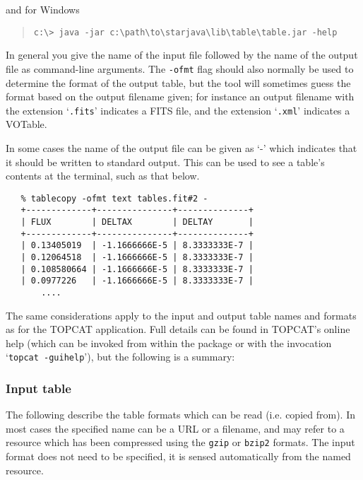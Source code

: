 \documentclass[twoside,11pt]{article}
\newcommand{\xlabel}[1]{}
\renewcommand{\_}{\texttt{\symbol{95}}}
\begin{document}
and for Windows

\begin{quote}
\begin{verbatim}
c:\> java -jar c:\path\to\starjava\lib\table\table.jar -help
\end{verbatim}
\end{quote}

In general you give the name of the input file followed by the
name of the output file as command-line arguments.  The \texttt{-ofmt}
flag should also normally be used to determine the format of the
output table, but the tool will sometimes guess the format based
on the output filename given; for instance an output filename with
the extension `\texttt{.fits}' indicates a FITS file, and the extension `\texttt{.xml}'
indicates a VOTable.

In some cases the name of the output file can be given as `-' which
indicates that it should be written to standard output.
This can be used to see a table's contents at the terminal, 
such as that below.

\begin{verbatim}
   % tablecopy -ofmt text tables.fit#2 -
   +-------------+---------------+--------------+
   | FLUX        | DELTAX        | DELTAY       |
   +-------------+---------------+--------------+
   | 0.13405019  | -1.1666666E-5 | 8.3333333E-7 |
   | 0.12064518  | -1.1666666E-5 | 8.3333333E-7 |
   | 0.108580664 | -1.1666666E-5 | 8.3333333E-7 |
   | 0.0977226   | -1.1666666E-5 | 8.3333333E-7 |
       ....
\end{verbatim}

The same considerations apply to the input and output table names
and formats as for the TOPCAT application.
Full details can be found in TOPCAT's online help (which can be
invoked from within the package or with the
invocation `\texttt{topcat -guihelp}'),
but the following is a summary:

\subsubsection{\label{Input}\xlabel{Input}Input table}

The following describe the table formats which can 
be read (i.e. copied from).  In most cases the specified name
can be a URL or a filename, and may refer to a resource which has
been compressed using the \texttt{gzip} or \texttt{bzip2} formats.
The input format does not need to be specified, it is sensed automatically
from the named resource.
\end{document}
